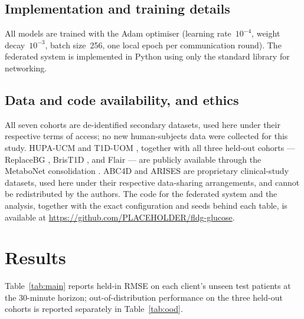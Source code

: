 \documentclass[10pt,letterpaper]{article}
\begin{document}
\subsection*{Implementation and training details}

All models are trained with the Adam optimiser (learning rate~$10^{-4}$, weight
decay~$10^{-3}$, batch size~256, one local epoch per communication round). The
federated system is implemented in Python using only the standard library for
networking.

\subsection*{Data and code availability, and ethics}

All seven cohorts are de-identified secondary datasets, used here under their
respective terms of access; no new human-subjects data were collected for this
study. HUPA-UCM \cite{hidalgo2024hupaucm} and T1D-UOM \cite{alsuhaymi2025t1duom},
together with all three held-out cohorts --- ReplaceBG
\cite{aleppo2017replacebg}, BrisT1D \cite{james2025brist1d}, and Flair
\cite{jaeb_flair} --- are publicly available through the MetaboNet consolidation
\cite{wolff2026metabonet}. ABC4D \cite{abc4d_nct} and ARISES
\cite{zhu2022arises} are proprietary clinical-study datasets, used here under
their respective data-sharing arrangements, and cannot be redistributed by the
authors. The code for the federated system and the analysis, together with the
exact configuration and seeds behind each table, is available at
\url{https://github.com/PLACEHOLDER/fldg-glucose}.

\section*{Results}

Table~\ref{tab:main} reports held-in RMSE on each client's unseen test patients at
the 30-minute horizon; out-of-distribution performance on
the three held-out cohorts is reported separately in Table~\ref{tab:ood}.
\end{document}
